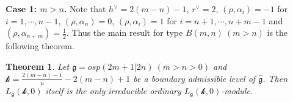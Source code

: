 \documentclass[12pt]{article}
\newtheorem{thm}{Theorem}[section]
\begin{document}
{\bf Case 1: $m>n$.} %
Note that $h^{\vee}=2(m-n)-1$, $r^\vee=2$,
$(\rho, \alpha_i)=-1$ for $i=1,\cdots,n-1$, $(\rho, \alpha_n)=0$,
$(\rho, \alpha_i)=1$ for $i=n+1,\cdots,n+m-1$ and $(\rho, \alpha_{n+m})=\frac{1}{2}$.
Thus the main result for type $B(m,n)~(m>n)$ is the following theorem.
\begin{thm}\label{thmbmn}
Let $\mathfrak{g}=osp(2m+1|2n)~(m>n>0)$ and
$\mathcal{k}=\frac{2(m-n)-1}{u}-2(m-n)+1$ be a boundary admissible level of $\widehat{\mathfrak{g}}$.
Then $L_{\widehat{\mathfrak{g}}}(\mathcal{k},0)$ itself is the only irreducible ordinary $L_{\widehat{\mathfrak{g}}}(\mathcal{k},0)$-module.
\end{thm}
\end{document}
